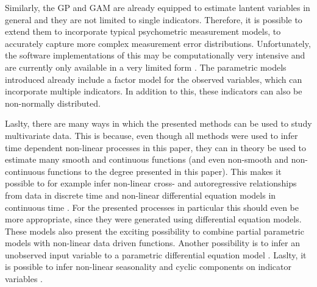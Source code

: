 \documentclass[man, floatsintext]{apa7}
\begin{document}
Similarly, the GP and GAM are already equipped to estimate lantent variables in
general and they are not limited to single indicators. Therefore, it
is possible to extend them to incorporate typical psychometric
measurement models, to accurately capture more complex measurement error
distributions. Unfortunately, the software implementations of this may be
computationally very intensive and are currently only available in a very
limited form \parencite{clark_dynamic_2023}. The parametric models introduced
already include a factor model for the observed variables, which can
incorporate multiple indicators. In addition to this, these indicators
can also be non-normally distributed.

Laslty, there are many ways in which the presented methods can be used to
study multivariate data. This is because, even though all methods were used
to infer time dependent non-linear processes in this paper, they can in theory
be used to estimate many smooth and continuous functions (and even non-smooth
and non-continuous functions to the degree presented in this paper). This
makes it possible to for example infer non-linear
cross- and autoregressive relationships from data in discrete time
\parencite{wood_generalized_2006, rasmussen_gaussian_2006,
  eleftheriadis_identification_2017}
and non-linear differential equation models in continuous time
\parencite{yildiz_learning_2018}. For the presented processes in particular
this should even be more appropriate, since they were generated using
differential equation models.
These models also present the exciting possibility to combine partial
parametric models with non-linear data driven functions.
Another possibility
is to infer an unobserved input variable to a parametric differential equation
model \parencite{alvarez_latent_2009,nayek_gaussian_2019}. Laslty, it is
possible to infer non-linear seasonality and cyclic components on indicator
variables \parencite{clark_dynamic_2023}.

\printbibliography[]
\end{document}
